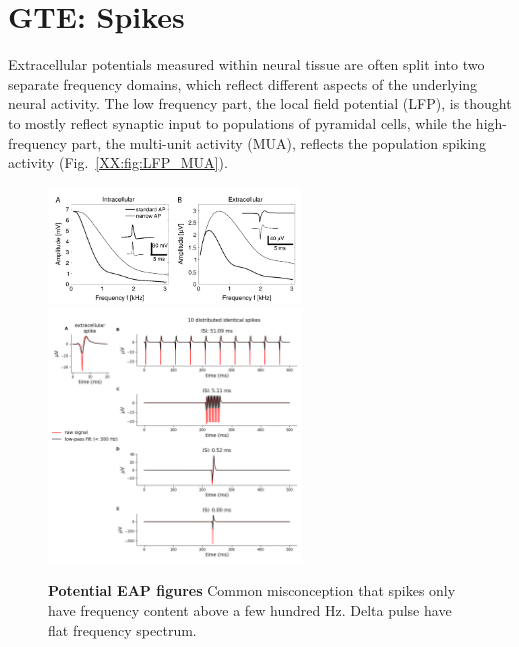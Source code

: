 \chapter{GTE: Spikes}
\label{sec:Spikes}

Extracellular potentials measured within neural tissue are often split into two separate frequency domains, which reflect different aspects of the underlying neural activity. The low frequency part, the local field potential (LFP), is thought to mostly reflect synaptic input to populations of pyramidal cells, while the high-frequency part, the multi-unit activity (MUA), reflects the population spiking activity (Fig.~\ref{XX:fig:LFP_MUA}).
\begin{figure}[!ht]
\begin{center}
\includegraphics[width=0.6\textwidth]{Figures/Spikes/Spikes-eap_illustration.png}
\includegraphics[width=0.6\textwidth]{Figures/Spikes/Spikes-LFP_spike_effect_test_300Hz.png}
\end{center}
\caption{\textbf{Potential EAP figures} 
Common misconception that spikes only have frequency content above a few hundred Hz. Delta pulse have flat frequency spectrum.}
\label{Spikes:fig:freq_dep}
\end{figure}

